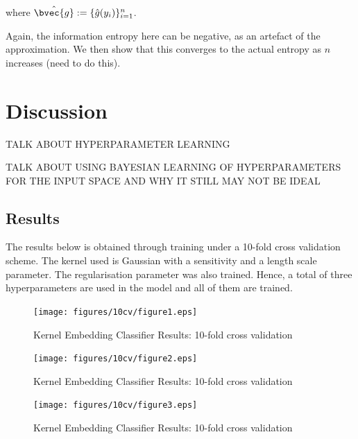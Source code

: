 \documentclass[a4paper, 12pt]{article}
\begin{document}
		where $\hat{\bvec{g}} := \{\hat{g}(y_{i})\}_{i = 1}^{n}$.
		
		Again, the information entropy here can be negative, as an artefact of the approximation. We then show that this converges to the actual entropy as $n$ increases (need to do this).

\section{Discussion}

	TALK ABOUT HYPERPARAMETER LEARNING
	
	TALK ABOUT USING BAYESIAN LEARNING OF HYPERPARAMETERS FOR THE INPUT SPACE AND WHY IT STILL MAY NOT BE IDEAL
		
	\subsection{Results}
	
		The results below is obtained through training under a 10-fold cross validation scheme. The kernel used is Gaussian with a sensitivity and a length scale parameter. The regularisation parameter was also trained. Hence, a total of three hyperparameters are used in the model and all of them are trained.

		\begin{figure}[!htbp]
			\centering
			\texttt{[image: figures/10cv/figure1.eps]}
			\caption{Kernel Embedding Classifier Results: 10-fold cross validation}
			\label{fig:figure_1}
		\end{figure}
		
		\begin{figure}[!htbp]
			\centering
			\texttt{[image: figures/10cv/figure2.eps]}
			\caption{Kernel Embedding Classifier Results: 10-fold cross validation}
			\label{fig:figure_2}
		\end{figure}
		
		\begin{figure}[!htbp]
			\centering
			\texttt{[image: figures/10cv/figure3.eps]}
			\caption{Kernel Embedding Classifier Results: 10-fold cross validation}
			\label{fig:figure_3}
		\end{figure}
		
\end{document}
